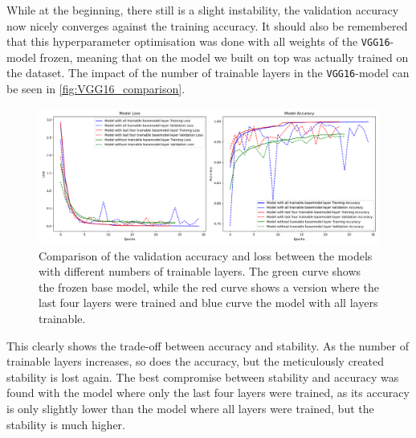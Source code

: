 While at the beginning, there still is a slight instability, the validation accuracy now nicely converges against the training accuracy.
It should also be remembered that this hyperparameter optimisation was done with all weights of the \texttt{VGG16}-model frozen,
meaning that on the model we built on top was actually trained on the dataset.
The impact of the number of trainable layers in the \texttt{VGG16}-model can be seen in \autoref{fig:VGG16_comparison}.

\begin{figure}[H]
    \centering
    \includegraphics[width=\textwidth]{images/VGG16_comparison.png}
    \caption{Comparison of the validation accuracy and loss between the models with different numbers of trainable layers.
    The green curve shows the frozen base model, while the red curve shows a version where the last four layers were trained and blue curve the model with all layers trainable.}
    \label{fig:VGG16_comparison}
\end{figure}

This clearly shows the trade-off between accuracy and stability.
As the number of trainable layers increases, so does the accuracy, but the meticulously created stability is lost again.
The best compromise between stability and accuracy was found with the model where only the last four layers were trained, 
as its accuracy is only slightly lower than the model where all layers were trained, but the stability is much higher.



